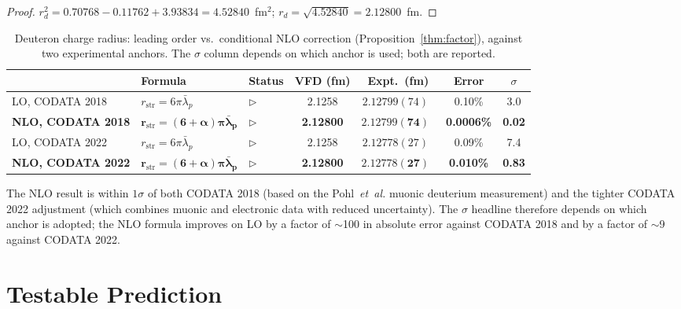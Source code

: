 \documentclass[12pt]{article}
\newcommand{\lbar}{\bar{\lambda}}
\begin{document}
\begin{proof}
$r_d^2 = 0.70768 - 0.11762 + 3.93834 = 4.52840$~fm$^2$;
$r_d = \sqrt{4.52840} = 2.12800$~fm.
\end{proof}

\begin{table}[ht]
\centering
\caption{Deuteron charge radius: leading order vs.\ conditional NLO correction (Proposition~\ref{thm:factor}), against two experimental anchors. The $\sigma$ column depends on which anchor is used; both are reported.}
\label{tab:deuteron}
\begin{tabular}{@{}lllcccc@{}}
\toprule
& Formula & Status & VFD (fm) & Expt.\ (fm) & Error & $\sigma$ \\
\midrule
LO, CODATA 2018 & $r_{\mathrm{str}} = 6\pi\lbar_p$ & $\triangleright$ &
    2.1258 & $2.12799(74)$~\citep{Pohl2016} & 0.10\% & 3.0 \\
\textbf{NLO, CODATA 2018} & $\boldsymbol{r_{\mathrm{str}} = (6{+}\alpha)\pi\lbar_p}$ &
    $\triangleright$ &
    \textbf{2.12800} & $\boldsymbol{2.12799(74)}$~\citep{Pohl2016} & \textbf{0.0006\%} &
    \textbf{0.02} \\
LO, CODATA 2022 & $r_{\mathrm{str}} = 6\pi\lbar_p$ & $\triangleright$ &
    2.1258 & $2.12778(27)$~\citep{CODATA2022} & 0.09\% & 7.4 \\
\textbf{NLO, CODATA 2022} & $\boldsymbol{r_{\mathrm{str}} = (6{+}\alpha)\pi\lbar_p}$ &
    $\triangleright$ &
    \textbf{2.12800} & $\boldsymbol{2.12778(27)}$~\citep{CODATA2022} & \textbf{0.010\%} &
    \textbf{0.83} \\
\bottomrule
\end{tabular}
\end{table}

The NLO result is within $1\sigma$ of both CODATA 2018 (based on the Pohl~\emph{et~al.} muonic deuterium measurement) and the tighter CODATA 2022 adjustment (which combines muonic and electronic data with reduced uncertainty). The $\sigma$ headline therefore depends on which anchor is adopted; the NLO formula improves on LO by a factor of $\sim$100 in absolute error against CODATA 2018 and by a factor of $\sim$9 against CODATA 2022.

\section{Testable Prediction}\label{sec:prediction}
\end{document}
